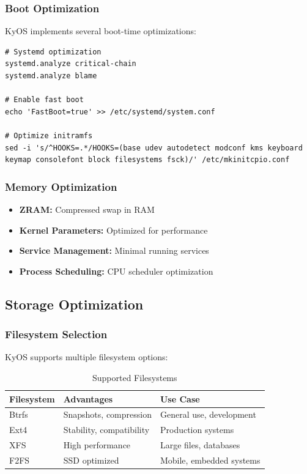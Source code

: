 \documentclass[12pt,a4paper]{article}
\begin{document}
\subsubsection{Boot Optimization}
KyOS implements several boot-time optimizations:

\begin{lstlisting}[caption=Boot Optimization Configuration]
# Systemd optimization
systemd.analyze critical-chain
systemd.analyze blame

# Enable fast boot
echo 'FastBoot=true' >> /etc/systemd/system.conf

# Optimize initramfs
sed -i 's/^HOOKS=.*/HOOKS=(base udev autodetect modconf kms keyboard keymap consolefont block filesystems fsck)/' /etc/mkinitcpio.conf
\end{lstlisting}

\subsubsection{Memory Optimization}
\begin{itemize}
    \item \textbf{ZRAM:} Compressed swap in RAM
    \item \textbf{Kernel Parameters:} Optimized for performance
    \item \textbf{Service Management:} Minimal running services
    \item \textbf{Process Scheduling:} CPU scheduler optimization
\end{itemize}

\subsection{Storage Optimization}

\subsubsection{Filesystem Selection}
KyOS supports multiple filesystem options:

\begin{table}[H]
\centering
\begin{tabular}{@{}lll@{}}
\toprule
\textbf{Filesystem} & \textbf{Advantages} & \textbf{Use Case} \\
\midrule
Btrfs & Snapshots, compression & General use, development \\
Ext4 & Stability, compatibility & Production systems \\
XFS & High performance & Large files, databases \\
F2FS & SSD optimized & Mobile, embedded systems \\
\bottomrule
\end{tabular}
\caption{Supported Filesystems}
\end{table}
\end{document}
